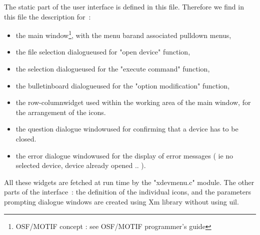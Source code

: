 %
%
%
%
%
%
%
%
%
%
The static part of the user interface is defined in this file. Therefore
we find in this file the description for~:
\begin{itemize}
\item
the main window\footnote[1]{OSF/MOTIF concept : see OSF/MOTIF programmer's
guide}, with the menu bar\footnotemark[1] and associated pulldown
menus\footnotemark[1],
\item
the file selection dialogue\footnotemark[1] used for "open device" function,
\item
the selection dialogue\footnotemark[1] used for the "execute command" function,
\item
the bulletinboard dialogue\footnotemark[1] used for the "option modification"
function,
\item
the row-column\footnotemark[1] widget used within the working area of the main
window, for the arrangement of the icons.
\item
the question dialogue window\footnotemark[1] used for confirming that a device 
has to be closed.
\item
the error dialogue window\footnotemark[1] used for the display of error messages
( ie  no selected device, device already opened .. ).
\end{itemize}

All these widgets are fetched at run time by the "xdevmenu.c" module.
The other parts of the interface~: the definition of the individual icons, and
the parameters prompting dialogue windows are created using Xm library without
using uil.

